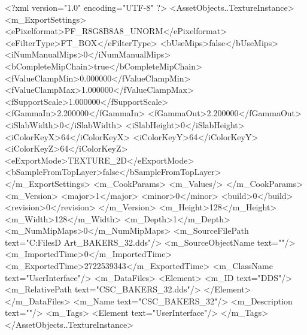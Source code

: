 <?xml version="1.0" encoding="UTF-8" ?>
<AssetObjects..TextureInstance>
	<m_ExportSettings>
		<ePixelformat>PF_R8G8B8A8_UNORM</ePixelformat>
		<eFilterType>FT_BOX</eFilterType>
		<bUseMips>false</bUseMips>
		<iNumManualMips>0</iNumManualMips>
		<bCompleteMipChain>true</bCompleteMipChain>
		<fValueClampMin>0.000000</fValueClampMin>
		<fValueClampMax>1.000000</fValueClampMax>
		<fSupportScale>1.000000</fSupportScale>
		<fGammaIn>2.200000</fGammaIn>
		<fGammaOut>2.200000</fGammaOut>
		<iSlabWidth>0</iSlabWidth>
		<iSlabHeight>0</iSlabHeight>
		<iColorKeyX>64</iColorKeyX>
		<iColorKeyY>64</iColorKeyY>
		<iColorKeyZ>64</iColorKeyZ>
		<eExportMode>TEXTURE_2D</eExportMode>
		<bSampleFromTopLayer>false</bSampleFromTopLayer>
	</m_ExportSettings>
	<m_CookParams>
		<m_Values/>
	</m_CookParams>
	<m_Version>
		<major>1</major>
		<minor>0</minor>
		<build>0</build>
		<revision>0</revision>
	</m_Version>
	<m_Height>128</m_Height>
	<m_Width>128</m_Width>
	<m_Depth>1</m_Depth>
	<m_NumMipMaps>0</m_NumMipMaps>
	<m_SourceFilePath text="C:\Users\Shadow\Desktop\Working Files\2D Art\Quarters\Bakers\CSC_BAKERS_32.dds"/>
	<m_SourceObjectName text=""/>
	<m_ImportedTime>0</m_ImportedTime>
	<m_ExportedTime>2722539343</m_ExportedTime>
	<m_ClassName text="UserInterface"/>
	<m_DataFiles>
		<Element>
			<m_ID text="DDS"/>
			<m_RelativePath text="CSC_BAKERS_32.dds"/>
		</Element>
	</m_DataFiles>
	<m_Name text="CSC_BAKERS_32"/>
	<m_Description text=""/>
	<m_Tags>
		<Element text="UserInterface"/>
	</m_Tags>
</AssetObjects..TextureInstance>

